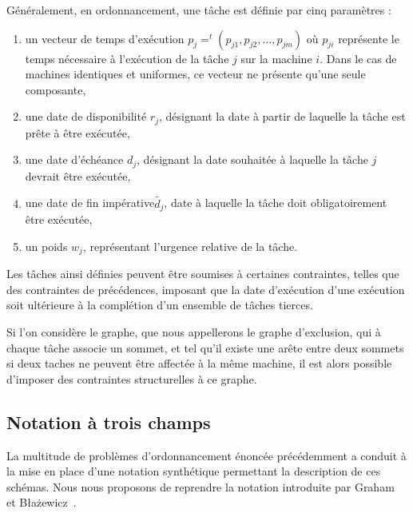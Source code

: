 \documentclass[a4paper,11pt]{article}
\begin{document}
Généralement, en ordonnancement, une tâche est définie par cinq paramètres :
\begin{enumerate}
    \item un vecteur de temps d'exécution $p_j = ^t(p_{j1}, p_{j2}, \dots, p_{jm})$ où $p_{ji}$
        représente le temps nécessaire à l'exécution de la tâche $j$ sur la machine $i$. Dans le cas
        de machines identiques et uniformes, ce vecteur ne présente qu'une seule composante,
    \item une date de disponibilité $r_j$, désignant la date à partir de laquelle la tâche est prête
        à être exécutée,
    \item une date d'échéance $d_j$, désignant la date souhaitée à laquelle la tâche $j$ devrait
        être exécutée,
    \item une date de fin impérative$\widetilde{d_j}$, date à laquelle la tâche doit obligatoirement être exécutée,
    \item un poids $w_j$, représentant l'urgence relative de la tâche.
\end{enumerate}

Les tâches ainsi définies peuvent être soumises à certaines contraintes, telles que des contraintes
de précédences, imposant que la date d'exécution d'une exécution soit ultérieure à la complétion
d'un ensemble de tâches tierces.

Si l'on considère le graphe, que nous appellerons le graphe d'exclusion, qui à chaque tâche associe
un sommet, et tel qu'il existe une arête entre deux sommets si deux taches ne peuvent être affectée
à la même machine, il est alors possible d'imposer des contraintes structurelles à ce graphe. 

\subsection{Notation à trois champs}

La multitude de problèmes d'ordonnancement énoncée précédemment a conduit à la mise en place d'une
notation synthétique permettant la description de ces schémas. Nous nous proposons de reprendre la
notation introduite par Graham~\cite{graham} et B\l a\.zewicz~\cite{blazewicz}. 
\end{document}

